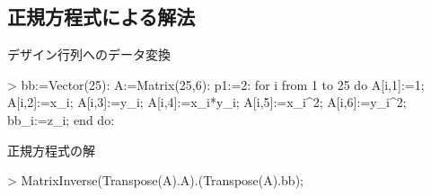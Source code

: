 \subsection{正規方程式による解法}
デザイン行列へのデータ変換
\begin{MapleInput}
> bb:=Vector(25): A:=Matrix(25,6): 
  p1:=2: 
  for i from 1 to 25 do 
    A[i,1]:=1;
    A[i,2]:=x_i; 
    A[i,3]:=y_i; 
    A[i,4]:=x_i*y_i; 
    A[i,5]:=x_i^2; 
    A[i,6]:=y_i^2;
    bb_i:=z_i; 
  end do:
\end{MapleInput}
正規方程式の解
\begin{MapleInput}
> MatrixInverse(Transpose(A).A).(Transpose(A).bb);
\end{MapleInput}
\begin{MapleOutput}
\end{MapleOutput}